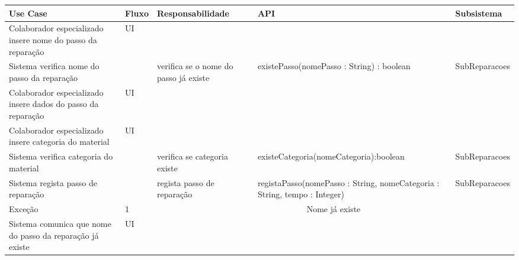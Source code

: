 \documentclass[../relatorio.tex]{subfiles}
\begin{document}
\begin{landscape}
    \begin{table}[!h]
        \centering
        \begin{tabular}{|p{5cm}|p{1cm}|p{4cm}|p{6cm}|p{3cm}|}
            \hline
            \rowcolor{gray!20!white}
            Use Case & Fluxo                                            & Responsabilidade & API & Subsistema \\
            \hline
            \rowcolor{yellow}
            Colaborador especializado insere nome do passo da reparação
                     & UI
                     & 
                     & 
                     & 
            \\
            \hline
            Sistema verifica nome do passo da reparação
                     & 
                     & verifica se o nome do passo já existe
                     & existePasso(nomePasso : String) : boolean
                     & SubReparacoes
            \\
            \hline
            \rowcolor{yellow}
            Colaborador especializado insere dados do passo da reparação
                     & UI
                     & 
                     & 
                     & 
            \\
            \hline
            \rowcolor{yellow}
            Colaborador especializado insere categoria do material
                     & UI
                     & 
                     & 
                     & 
            \\
            \hline
            Sistema verifica categoria do material
                     & 
                     & verifica se categoria existe
                     & existeCategoria(nomeCategoria):boolean
                     & SubReparacoes
            \\
            \hline
            Sistema regista passo de reparação
                     & 
                     & regista passo de reparação
                     & registaPasso(nomePasso : String, nomeCategoria : String, tempo : Integer)
                     & SubReparacoes
            \\
            \hline
            \rowcolor{red!30}
            Exceção  & 1                                                 &  \multicolumn{3}{c}{Nome já existe}\\
            \hline
            \rowcolor{yellow}
            Sistema comunica que nome do passo da reparação já existe
                     & UI
                     & 
                     & 

\end{tabular}
\end{table}
\end{landscape}
\end{document}
